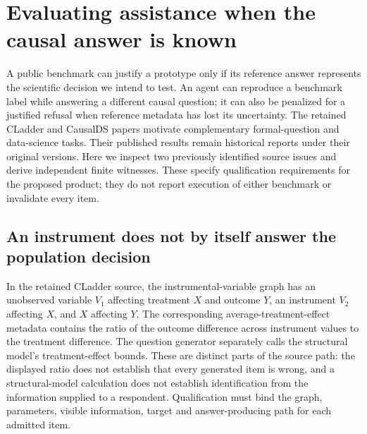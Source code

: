 \section[Independent causal and scoring oracles]{Evaluating assistance when the causal answer is known}
\label{sec:exec25-bor}

A public benchmark can justify a prototype only if its reference answer represents the scientific decision we intend to test. An agent can reproduce a benchmark label while answering a different causal question; it can also be penalized for a justified refusal when reference metadata has lost its uncertainty. The retained CLadder and CausalDS papers motivate complementary formal-question and data-science tasks. Their published results remain historical reports under their original versions. Here we inspect two previously identified source issues and derive independent finite witnesses. These specify qualification requirements for the proposed product; they do not report execution of either benchmark or invalidate every item.\citep{v12_la_2312_04350,v12_la_2607_08093,exec25_bor_sources,exec25_bor_reference}

\subsection{An instrument does not by itself answer the population decision}

In the retained CLadder source, the instrumental-variable graph has an unobserved variable $V_1$ affecting treatment $X$ and outcome $Y$, an instrument $V_2$ affecting $X$, and $X$ affecting $Y$. The corresponding average-treatment-effect metadata contains the ratio of the outcome difference across instrument values to the treatment difference. The question generator separately calls the structural model's treatment-effect bounds. These are distinct parts of the source path: the displayed ratio does not establish that every generated item is wrong, and a structural-model calculation does not establish identification from the information supplied to a respondent. Qualification must bind the graph, parameters, visible information, target and answer-producing path for each admitted item.\citep{exec25_bor_sources}

